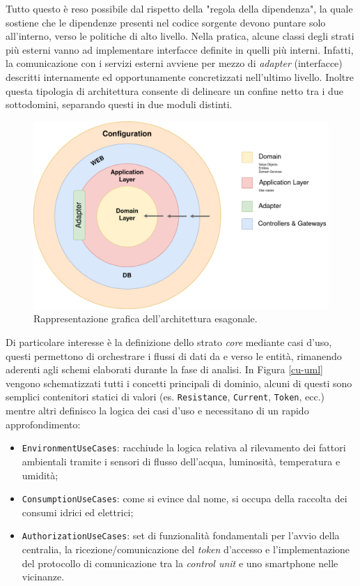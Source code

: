 Tutto questo è reso possibile dal rispetto della "regola della dipendenza", la quale sostiene che le dipendenze presenti nel codice sorgente devono puntare solo all'interno, verso le politiche di alto livello. Nella pratica, alcune classi degli strati più esterni vanno ad implementare interfacce definite in quelli più interni. Infatti, la comunicazione con i servizi esterni avviene per mezzo di \textit{adapter} (interfacce) descritti internamente ed opportunamente concretizzati nell'ultimo livello. Inoltre questa tipologia di architettura consente di delineare un confine netto tra i due sottodomini, separando questi in due moduli distinti.
%
\begin{figure}[H]
    \centering
    \includegraphics[width=\textwidth]{images/cl-architecture.png}\hfill
    \caption{\label{clarc}Rappresentazione grafica dell'architettura esagonale.}
\end{figure}
Di particolare interesse è la definizione dello strato \textit{core} mediante casi d'uso, questi permettono di orchestrare i flussi di dati da e verso le entità, rimanendo aderenti agli schemi elaborati durante la fase di analisi. In Figura \ref{cu-uml} vengono schematizzati tutti i concetti principali di dominio, alcuni di questi sono semplici contenitori statici di valori (es. \texttt{Resistance}, \texttt{Current}, \texttt{Token}, ecc.) mentre altri definisco la logica dei casi d'uso e necessitano di un rapido approfondimento:
\begin{itemize}
    \item \texttt{EnvironmentUseCases}: racchiude la logica relativa al rilevamento dei fattori ambientali tramite i sensori di flusso dell'acqua, luminosità, temperatura e umidità;
    \item \texttt{ConsumptionUseCases}: come si evince dal nome, si occupa della raccolta dei consumi idrici ed elettrici;
    \item \texttt{AuthorizationUseCases}: set di funzionalità fondamentali per l'avvio della centralia, la ricezione/comunicazione del \textit{token} d'accesso e l'implementazione del protocollo di comunicazione tra la \textit{control unit} e uno smartphone nelle vicinanze.
\end{itemize}
